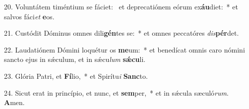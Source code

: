 20. Voluntátem timéntium se fáciet: \dag\  et deprecatiónem eórum ex\textbf{áu}diet:~*  et salvos fáci\textit{et} \textbf{e}os.\

21. Custódit Dóminus omnes dili\textbf{gén}tes se:~*  et omnes peccatóres \textit{dis}\textbf{pér}det.\

22. Laudatiónem Dómini loquétur os \textbf{me}um:~*  et benedícat omnis caro nómini sancto ejus in sǽculum, et in sǽcu\textit{lum} \textbf{sǽ}\textbf{cu}li.\

23. Glória Patri, et \textbf{Fí}lio,~*  et Spirítu\textit{i} \textbf{Sanc}to.\

24. Sicut erat in princípio, et nunc, et \textbf{sem}per,~*  et in sǽcula sæculó\textit{rum}. \textbf{A}men.\

